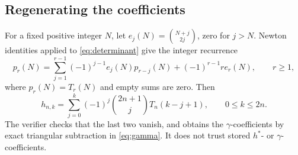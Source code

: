 \documentclass[11pt,letterpaper]{article}
\numberwithin{equation}{section}
\begin{document}
\subsection{Regenerating the coefficients}
For a fixed positive integer $N$, let $e_j(N)=\binom{N+j}{2j}$, zero for $j>N$. Newton identities applied to \eqref{eq:determinant} give the integer recurrence
\begin{equation}\label{eq:newton}
 p_r(N)=\sum_{j=1}^{r-1}(-1)^{j-1}e_j(N)p_{r-j}(N)
 +(-1)^{r-1}r e_r(N),\qquad r\ge1,
\end{equation}
where $p_r(N)=T_r(N)$ and empty sums are zero. Then
\begin{equation}\label{eq:hcoeff}
 h_{n,k}=\sum_{j=0}^k(-1)^j\binom{2n+1}{j}T_n(k-j+1),\qquad 0\le k\le2n.
\end{equation}
The verifier checks that the last two vanish, and obtains the $\gamma$-coefficients by exact triangular subtraction in \eqref{eq:gamma}. It does not trust stored $h^*$- or $\gamma$-coefficients.
\end{document}
